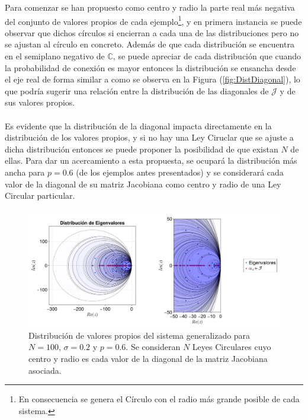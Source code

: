 Para comenzar se han propuesto como centro y radio la parte real más negativa del conjunto de valores propios de cada ejemplo\footnote{En consecuencia se genera el Círculo con el radio más grande posible de cada sistema.}, y en primera instancia se puede observar que dichos círculos si encierran a cada una de las distribuciones pero no se ajustan al círculo en concreto. Además de que cada distribución se encuentra en el semiplano negativo de $\mathbb{C}$, se puede apreciar de cada distribución que cuando la probabilidad de conexión es mayor entonces  la distribución se ensancha desde el eje real de forma similar a como se observa en la Figura (\ref{fig:DistDiagonal}), lo que podría sugerir una relación entre la distribución de las diagonales de $\mathcal{J}$ y de sus valores propios. \\
\\
Es evidente que la distribución de la diagonal impacta directamente en la distribución de los valores propios, y si no hay una Ley Ciruclar que se ajuste a dicha distribución entonces se puede proponer la posibilidad de que existan $N$ de ellas. Para dar un acercamiento a esta propuesta, se ocupará la distribución más ancha para $p=0.6$ (de los ejemplos antes presentados) y se considerará cada valor de la diagonal de su matriz Jacobiana como centro y radio de una Ley Circular particular.
\begin{figure}[h!]
	\centering
	\includegraphics[scale=0.17]{../Imagenes/LeyesCirculares}
	\caption{Distribución de valores propios del sistema generalizado para $N=100$, $\sigma=0.2$ y $p=0.6$. Se consideran $N$ Leyes Circulares cuyo centro y radio es cada valor de la diagonal de la matriz Jacobiana asociada. }
	\label{fig:LeyesCirculares}
\end{figure}


